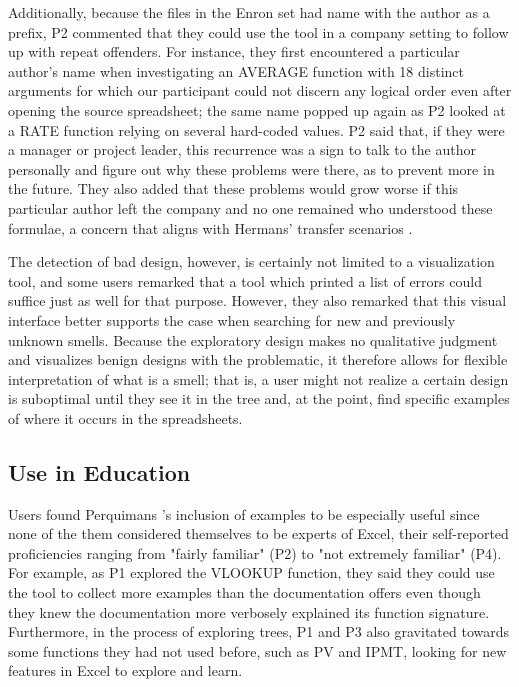 \documentclass[conference]{IEEEtran}
\newcommand{\toolname}{Perquimans } \newcommand{\toolnameend}{Perquimans}
\begin{document}
	Additionally, because the files in the Enron set had name with the author as a
	prefix, P2 commented that they could use the tool in a company setting to
	follow up with repeat offenders. For instance, they first encountered a
	particular author's name when investigating an AVERAGE function with 18
	distinct arguments for which our participant could not discern any logical
	order even after opening the source spreadsheet; the same name popped up again
	as P2 looked at a RATE function relying on several hard-coded values. P2 said
	that, if they were a manager or project leader, this recurrence was a sign to
	talk to the author personally and figure out why these problems were there, as
	to prevent more in the future. They also added that these problems would grow
	worse if this particular author left the company and no one remained who
	understood these formulae, a concern that aligns with Hermans' transfer
	scenarios \cite{hermans2011supporting}.
	
	The detection of bad design, however, is certainly not limited to a
	visualization tool, and some users remarked that a tool which printed a list of
	errors could suffice just as well for that purpose. However, they also remarked
	that this visual interface better supports the case when searching for new and
	previously unknown smells. Because the exploratory design makes no
	qualitative judgment and visualizes benign designs with the problematic, it
	therefore allows for flexible interpretation of what is a smell; that is, a
	user might not realize a certain design is suboptimal until they see it in the
	tree and, at the point, find specific examples of where it occurs in the
	spreadsheets.
	
	\subsection{Use in Education} Users found \toolname's inclusion of examples to
	be especially useful since none of the them considered themselves to be experts
	of Excel, their self-reported proficiencies ranging from "fairly familiar" (P2)
	to "not extremely familiar" (P4). For example, as P1 explored the VLOOKUP
	function, they said they could use the tool to collect more examples than the
	documentation offers even though they knew the documentation more verbosely
	explained its function signature. Furthermore, in the process of exploring
	trees, P1 and P3 also gravitated towards some functions they had not used
	before, such as PV and IPMT, looking for new features in Excel to explore and
	learn. \par
	
\end{document}
